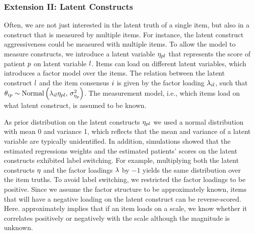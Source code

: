 \documentclass[a4paper,usenames,dvipsnames]{article}
\newenvironment{revision}{\color{teal}}{\color{black}}
\begin{document}
\subsubsection*{Extension II: Latent Constructs}
Often, we are not just interested in the latent truth of a single item, but also in a construct that is measured by multiple items. For instance, the latent construct aggressiveness could be measured with multiple items. To allow the model to measure constructs, we introduce a latent variable $\eta_{pl}$ that represents the score of patient $p$ on latent variable $l$. Items can load on different latent variables, which introduces a factor model over the items. The relation between the latent construct $l$ and the item consensus $i$ is given by the factor loading $\lambda_{il}$, such that $\theta_{ip} \sim \text{Normal}\left(\lambda_{il}\eta_{pl},\,\sigma^2_{\eta_{p}}\right)$. The measurement model, i.e., which items load on what latent construct, is assumed to be known.

As prior distribution on the latent constructs $\eta_{pl}$ we used a normal distribution with mean 0 and variance 1, which reflects that the mean and variance of a latent variable are typically  unidentified. In addition, simulations showed that the estimated regressions weights and the estimated patients' scores on the latent constructs exhibited label switching. For example, multiplying both the latent constructs $\eta$ and the factor loadings $\lambda$ by $-1$ yields the same distribution over the item truths. To avoid label switching, we restricted the factor loadings to be positive. Since we assume the factor structure to be approximately known, items that will have a negative loading on the latent construct can \begin{revision}be\end{revision} reverse-scored. Here. approximately implies that if an item loads on a scale, we know whether it correlates positively or negatively with the scale although the magnitude is unknown.
\end{document}
